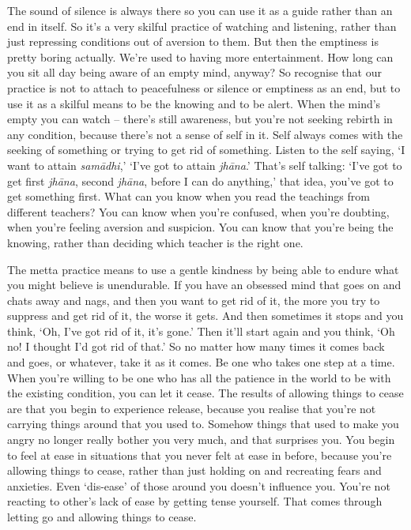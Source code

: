 The sound of silence is always there so you can use it as a guide rather than an end in itself. So it's a very skilful practice of watching and listening, rather than just repressing conditions out of aversion to them. But then the emptiness is pretty boring actually. We're used to having more entertainment. How long can you sit all day being aware of an empty mind, anyway? So recognise that our practice is not to attach to peacefulness or silence or emptiness as an end, but to use it as a skilful means to be the knowing and to be alert. When the mind's empty you can watch -- there's still awareness, but you're not seeking rebirth in any condition, because there's not a sense of self in it. Self always comes with the seeking of something or trying to get rid of something. Listen to the self saying, `I want to attain \textit{sam\=adhi},' `I've got to attain \textit{jh\=ana}.' That's self talking: `I've got to get first \textit{jh\=ana}, second \textit{jh\=ana}, before I can do anything,' that idea, you've got to get something first. What can you know when you read the teachings from different teachers? You can know when you're confused, when you're doubting, when you're feeling aversion and suspicion. You can know that you're being the knowing, rather than deciding which teacher is the right one.

The metta practice means to use a gentle kindness by being able to endure what you might believe is unendurable. If you have an obsessed mind that goes on and chats away and nags, and then you want to get rid of it, the more you try to suppress and get rid of it, the worse it gets. And then sometimes it stops and you think, `Oh, I've got rid of it, it's gone.' Then it'll start again and you think, `Oh no! I thought I'd got rid of that.' So no matter how many times it comes back and goes, or whatever, take it as it comes. Be one who takes one step at a time. When you're willing to be one who has all the patience in the world to be with the existing condition, you can let it cease. The results of allowing things to cease are that you begin to experience release, because you realise that you're not carrying things around that you used to. Somehow things that used to make you angry no longer really bother you very much, and that surprises you. You begin to feel at ease in situations that you never felt at ease in before, because you're allowing things to cease, rather than just holding on and recreating fears and anxieties. Even `dis-ease' of those around you doesn't influence you. You're not reacting to other's lack of ease by getting tense yourself. That comes through letting go and allowing things to cease.

